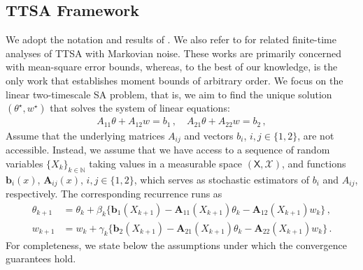 \documentclass{article}
\theoremstyle{definition}
\theoremstyle{remark}
\theoremstyle{plain}
\def\nset{\mathbb{N}}
\def\eqsp{\,}
\def\Xset{\mathsf{X}}
\def\Xsigma{\mathcal{X}}
\def\funcbw{\mathbf{b}}
\def\funcAw{\mathbf{A}}
\numberwithin{equation}{section}
\begin{document}
\subsection{TTSA Framework}
\label{app:ttsa_framework}
We adopt the notation and results of \cite{butyrin2026gaussian}. We also refer to
\cite{kwon2024two,haque2023tight,doan2021finite,kaledin2020finite} for related finite-time analyses of TTSA with Markovian noise. These works are primarily concerned with mean-square error bounds, whereas, to the best of our knowledge, \cite{butyrin2026gaussian} is the only work that establishes moment bounds of arbitrary order.  We focus on the linear two-timescale SA problem, that is, we aim to find the unique solution $(\theta^\star, w^\star)$ that solves the system of linear equations:
\begin{align} 
\label{eq:linear_sys}
A_{11} \theta + A_{12} w = b_1\eqsp, \quad A_{21} \theta + A_{22} w = b_2\eqsp,
\end{align}
 Assume that the underlying matrices $A_{ij}$ and vectors $b_i$, $i,j \in \{1,2\}$, are not accessible. Instead, we assume that we have access to a sequence of random variables $\{X_k\}_{k \in \nset}$ taking values in a measurable space $(\Xset,\Xsigma)$, and  functions $\funcbw_i(x)$, $\funcAw_{ij}(x)$, $i,j \in \{1,2\}$, which serves as stochastic estimators of $b_i$ and $A_{ij}$, respectively. The corresponding recurrence runs as 
\begin{equation}
\label{eq:tts-gen1}
\begin{split}
\theta_{k+1} &= \theta_k + \beta_k \{ \funcbw^{}_{1}(X_{k+1}) - \funcAw^{}_{11}(X_{k+1}) \theta_k - \funcAw^{}_{12}(X_{k+1}) w_k \}\eqsp, \\
w_{k+1} &= w_k + \gamma_k \{ \funcbw^{}_{2}(X_{k+1}) - \funcAw^{}_{21}(X_{k+1}) \theta_k - \funcAw^{}_{22}(X_{k+1})w_k \}\eqsp.
\end{split}
\end{equation}
For completeness, we state below the assumptions under which the convergence guarantees hold.
\end{document}
